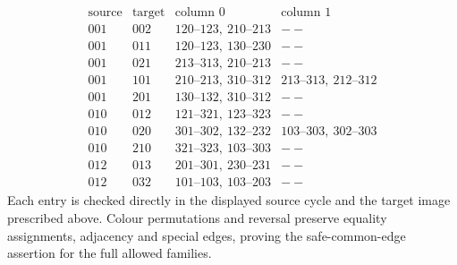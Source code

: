 \[
\begin{array}{c|c|l|l}
\text{source}&\text{target}&\text{column }0&\text{column }1\\\hline
001&002&120\!\text{--}\!123,\ 210\!\text{--}\!213&--\\
001&011&120\!\text{--}\!123,\ 130\!\text{--}\!230&--\\
001&021&213\!\text{--}\!313,\ 210\!\text{--}\!213&--\\
001&101&210\!\text{--}\!213,\ 310\!\text{--}\!312&213\!\text{--}\!313,\ 212\!\text{--}\!312\\
001&201&130\!\text{--}\!132,\ 310\!\text{--}\!312&--\\
010&012&121\!\text{--}\!321,\ 123\!\text{--}\!323&--\\
010&020&301\!\text{--}\!302,\ 132\!\text{--}\!232&103\!\text{--}\!303,\ 302\!\text{--}\!303\\
010&210&321\!\text{--}\!323,\ 103\!\text{--}\!303&--\\
012&013&201\!\text{--}\!301,\ 230\!\text{--}\!231&--\\
012&032&101\!\text{--}\!103,\ 103\!\text{--}\!203&--
\end{array}
\]
Each entry is checked directly in the displayed source cycle and the
target image prescribed above. Colour permutations and reversal
preserve equality assignments, adjacency and special edges, proving
the safe-common-edge assertion for the full allowed families.
